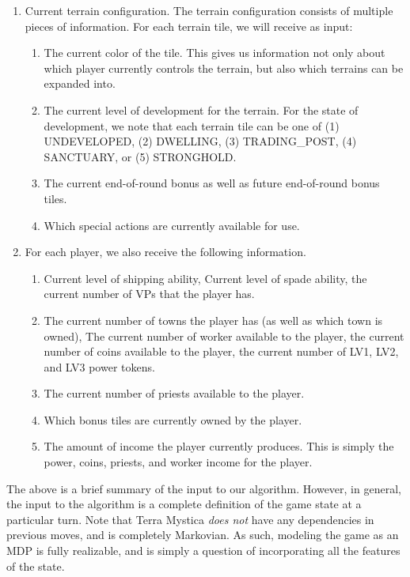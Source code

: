 \documentclass[10pt,twocolumn,letterpaper]{article}
\begin{document}
\begin{enumerate}
    \item Current terrain configuration. The terrain configuration consists of multiple pieces of information. For each terrain tile, we will receive as input:
    \begin{enumerate}
        \item The current color of the tile. This gives us information not only about which player currently controls the terrain, but also which terrains can be expanded into.
        \item The current level of development for the terrain. For the state of development, we note that each terrain tile can be one of (1) UNDEVELOPED, (2) DWELLING, (3) TRADING\_POST, (4) SANCTUARY, or (5) STRONGHOLD.
        \item The current end-of-round bonus as well as future end-of-round bonus tiles.
        \item Which special actions are currently available for use.
    \end{enumerate}
    \item For each player, we also receive the following information.
    \begin{enumerate}
        \item Current level of shipping ability, Current level of spade ability, the current number of VPs that the player has.
        \item The current number of towns the player has (as well as which town is owned), The current number of worker available to the player, the current number of coins available to the player, the current number of LV1, LV2, and LV3 power tokens.
        \item The current number of priests available to the player.
        \item Which bonus tiles are currently owned by the player.
        \item The amount of income the player currently produces. This is simply the power, coins, priests, and worker income for the player.
    \end{enumerate}
\end{enumerate}

The above is a brief summary of the input to our algorithm. However, in general, the input to the algorithm is a complete definition of the game state at a particular turn. Note that Terra Mystica \textit{does not} have any dependencies in previous moves, and is completely Markovian. As such, modeling the game as an MDP is fully realizable, and is simply a question of incorporating all the features of the state.
\end{document}
